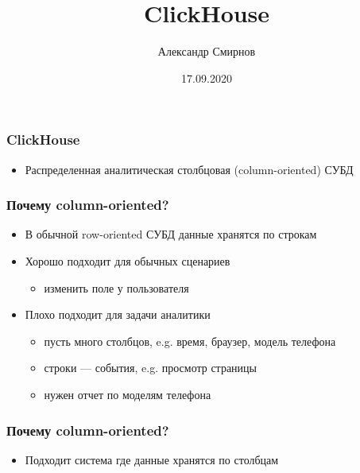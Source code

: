 \documentclass[xetex,mathserif,serif]{beamer}
\title{ClickHouse}
\author[Александр Смирнов]{Александр Смирнов}
\date{17.09.2020}
\begin{document}
\begin{frame}
	\titlepage{}
\end{frame}

\begin{frame}
	\frametitle{ClickHouse}

	\begin{itemize}
		\item Распределенная аналитическая столбцовая (column-oriented) СУБД
	\end{itemize}
\end{frame}

\begin{frame}
	\frametitle{Почему column-oriented?}

	\begin{center}
	\end{center}

	\begin{itemize}
		\item В обычной row-oriented СУБД данные хранятся по строкам
		\item Хорошо подходит для обычных сценариев
		      \begin{itemize}
			      \item изменить поле у пользователя
		      \end{itemize}
		\item Плохо подходит для задачи аналитики
		      \begin{itemize}
			      \item пусть много столбцов, e.g. время, браузер, модель телефона
			      \item строки — события, e.g. просмотр страницы
			      \item нужен отчет по моделям телефона
		      \end{itemize}
	\end{itemize}
\end{frame}


\begin{frame}
	\frametitle{Почему column-oriented?}

	\begin{center}
	\end{center}

	\begin{itemize}
		\item Подходит система где данные хранятся по столбцам
	\end{itemize}
\end{frame}
\end{document}
